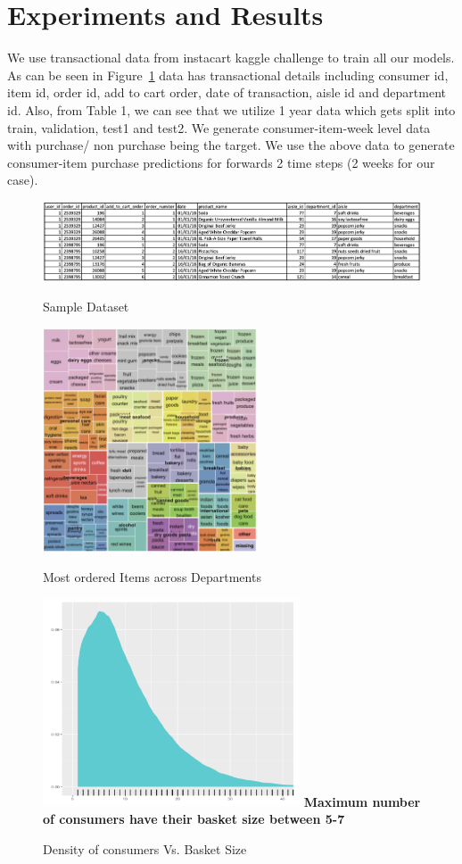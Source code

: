 \section{Experiments and Results}
We use transactional data from instacart kaggle challenge to train all our models. As can 
be seen in Figure~\ref{fig:sampledata} data has transactional details including consumer id, item id, 
order id, add to cart order, date of transaction, aisle id and department id.
Also, from Table 1, we can see that we utilize 1 year data which gets split into train, validation,
test1 and test2. We generate consumer-item-week level data with purchase/ non purchase being the target.
We use the above data to generate consumer-item purchase predictions for forwards 2 time steps (2 weeks for our case).
 \begin{figure}[!t]
    \centering 
    \caption{Sample Dataset} 
    \includegraphics[width=6.6in]{img/sampledata.png} 
    \label{fig:sampledata} 
  \end{figure}

  \begin{figure}[t]
    \centering 
    \caption{Most ordered Items across Departments} 
    \includegraphics[width=2.5in]{img/items.png} 
    \label{fig:items} 
  \end{figure}

  \begin{figure}[t]
    \centering 
    \caption{Density of consumers Vs. Basket Size} 
    \includegraphics[width=3in]{img/basket.png} 
    {\bf Maximum number of consumers have their basket size between 5-7}
    \label{fig:basket} 
  \end{figure}

